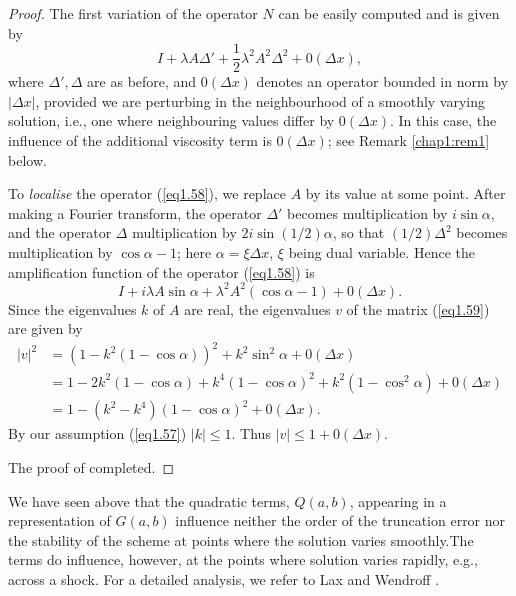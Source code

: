 \begin{proof}
The first variation of the operator $N$ can be easily computed and is given by 
\begin{equation*}
I + \lambda A\Delta' + \frac{1}{2} \lambda^2 A^2 \Delta^2 + 0 (\Delta x), 
\tag{1.58}\label{eq1.58}
\end{equation*}\pageoriginale
where $\Delta',\Delta$ are as before, and $0 (\Delta x)$ denotes an operator bounded in norm by $|\Delta x |$, provided we are perturbing in the neighbourhood of a smoothly varying solution, i.e., one where neighbouring values differ by $0(\Delta x)$. In this case, the influence of the additional viscosity term is $0(\Delta x)$; see Remark \ref{chap1:rem1} below. 

To {\em localise} the operator (\ref{eq1.58}), we replace $A$ by its value at some point. After making a Fourier transform, the operator $\Delta'$ becomes multiplication by $i \sin \alpha$, and the operator $\Delta$ multiplication by $2i \sin (1/2) \alpha$, so that $(1/2)\Delta^2$ becomes multiplication by $\cos \alpha -1$; here $\alpha = \xi \Delta x$, $\xi$ being dual variable. Hence the amplification function of the operator (\ref{eq1.58}) is 
\begin{equation*}
I + i \lambda A \sin \alpha + \lambda^2 A^2 (\cos \alpha -1) + 0 (\Delta x). 
\tag{1.59}\label{eq1.59}
\end{equation*}
Since the eigenvalues $k$ of $A$ are real, the eigenvalues $v$ of the matrix (\ref{eq1.59}) are given by 
\begin{align*}
|v|^2 & = (1-k^2 (1-\cos \alpha))^2 + k^2 \sin^2 \alpha + 0 (\Delta x)\\
& = 1 - 2k^2 (1-\cos \alpha) + k^4 (1-\cos \alpha)^2 + k^2 (1-\cos^2 \alpha) + 0 (\Delta x)\\
& = 1 - (k^2 - k^4) (1- \cos \alpha)^2 + 0 (\Delta x). 
\end{align*}
By our assumption (\ref{eq1.57}) $|k| \leq 1$. Thus $|v| \leq 1+ 0(\Delta x)$. 

The proof of completed.
\end{proof}

\setcounter{remark}{0}
\begin{remark}\label{chap1:rem1+}
We have seen above that the quadratic terms, $Q(a,b)$, appearing in a representation of $G(a,b)$ influence neither the order of the truncation error nor the stability of the scheme at points where the solution varies smoothly.\pageoriginale The terms do influence, however, at the points where solution varies rapidly, e.g., across a shock. For a detailed analysis, we refer to Lax and Wendroff \cite{key24}.
\end{remark}

